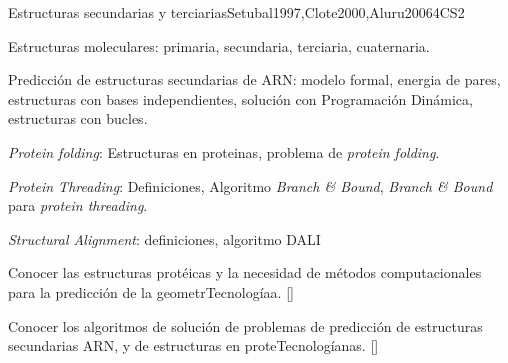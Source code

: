 \begin{syllabus}
\begin{unit}{Estructuras secundarias y terciarias}{}{Setubal1997,Clote2000,Aluru2006}{4}{CS2}
   \begin{topics}
    \item Estructuras moleculares: primaria, secundaria, terciaria, cuaternaria.
    \item Predicción de estructuras secundarias de ARN: modelo formal, energia de pares, estructuras con bases independientes, solución con Programación Dinámica, estructuras con bucles.
    \item \textit{Protein folding}: Estructuras en proteinas, problema de \textit{protein folding}.
    \item \textit{Protein Threading}: Definiciones, Algoritmo \textit{Branch \& Bound}, \textit{Branch \& Bound} para \textit{protein threading}.
    \item \textit{Structural Alignment}: definiciones, algoritmo DALI
   \end{topics}
   \begin{learningoutcomes}
     \item Conocer las estructuras protéicas y la necesidad de métodos computacionales para la predicción de la geometrTecnologíaa. [\Familiarity]
	   \item Conocer los algoritmos de solución de problemas de predicción de estructuras secundarias ARN, y de estructuras en proteTecnologíanas. [\Assessment]
   \end{learningoutcomes}
\end{unit}


\end{syllabus}
